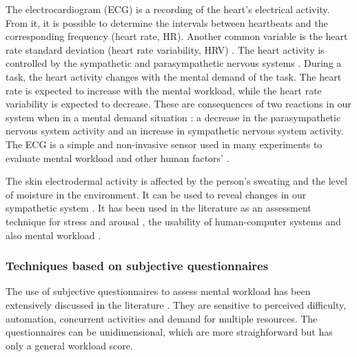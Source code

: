         The electrocardiogram (ECG) is a recording of the heart's electrical activity. From it, it is possible to determine the intervals between heartbeats and the corresponding frequency (heart rate, HR). Another common variable is the heart rate standard deviation (heart rate variability, HRV) \cite{cain2007review}. The heart activity is controlled by the sympathetic and parasympathetic nervous systems \cite{stanton2004handbook}. During a task, the heart activity changes with the mental demand of the task. The heart rate is expected to increase with the mental workload, while the heart rate variability is expected to decrease. These are consequences of two reactions in our system when in a mental demand situation \cite{stanton2004handbook}: a decrease in the parasympathetic nervous system activity and an increase in sympathetic nervous system activity. The ECG is a simple and non-invasive sensor used in many experiments to evaluate mental workload and other human factors' \cite{mohanavelu2020cognitive, mansikka2016fighter, zhang2014detection}.
                
         The skin electrodermal activity is affected by the person's sweating and the level of moisture in the environment. It can be used to reveal changes in our sympathetic system \cite{nourbakhsh2012using, shi2007galvanic}. It has been used in the literature as an assessment technique for stress and arousal \cite{nourbakhsh2012using, stanton2004handbook, shi2007galvanic}, the usability of human-computer systems \cite{shi2007galvanic} and also mental workload \cite{zhang2014detection, borghini2014measuring}.
    
    \subsubsection*{Techniques based on subjective questionnaires}

        The use of subjective questionnaires to assess mental workload has been extensively discussed in the literature \cite{sanders1998human, stanton2004handbook}. They are sensitive to perceived difficulty, automation, concurrent activities and demand for multiple resources. The questionnaires can be unidimensional, which are more straighforward but has only a general workload score.

